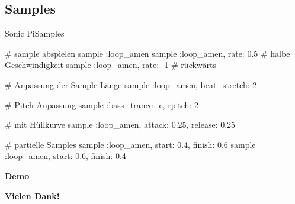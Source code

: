 \documentclass{beamer}
\begin{document}
\subsection{Samples}
\begin{frame}[fragile]{Sonic Pi}{Samples}
  \begin{rubycode}
    # sample abspielen
    sample :loop_amen
    sample :loop_amen, rate: 0.5 # halbe Geschwindigkeit
    sample :loop_amen, rate: -1  # rückwärts

    # Anpassung der Sample-Länge
    sample :loop_amen, beat_stretch: 2

    # Pitch-Anpassung
    sample :bass_trance_c, rpitch: 2

    # mit Hüllkurve
    sample :loop_amen, attack: 0.25, release: 0.25

    # partielle Samples
    sample :loop_amen, start: 0.4, finish: 0.6
    sample :loop_amen, start: 0.6, finish: 0.4

  \end{rubycode}
\end{frame}

\begin{frame}
  \centering
  \textbf{\textcolor{fg}{\Huge{Demo}}}
\end{frame}

\begin{frame}
  \centering
  \textbf{\textcolor{fg}{\Huge{Vielen Dank!}}}
\end{frame}
\end{document}
